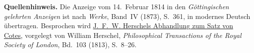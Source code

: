 \par\medskip\begin{small}\noindent\textbf{Quellenhinweis.} Die Anzeige vom 14.~Februar 1814 in den \textit{Göttingischen gelehrten Anzeigen} ist nach \textit{Werke}, Band~IV (1873), S.~361, in modernes Deutsch übertragen. Besprochen wird \href{https://doi.org/10.1098/rstl.1813.0005}{J.~F.~W. Herschels Abhandlung zum Satz von Cotes}, vorgelegt von William Herschel, \textit{Philosophical Transactions of the Royal Society of London}, Bd.~103 (1813), S.~8--26.\par\end{small}
